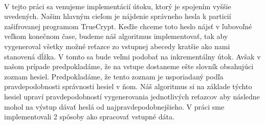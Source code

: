 \paragraph{}
V tejto práci sa venujeme implementácií útoku, ktorý je spojením vyššie uvedených. Našim hlavným cieľom je nájdenie správneho hesla k particií zašifrovanej programom TrueCrypt. Keďže chceme toto heslo nájsť v ľubovoľné veľkom konečnom čase, budeme náš algoritmus implementovať, tak aby vygeneroval všetky možné reťazce zo vstupnej abecedy kratšie ako nami stanovená dĺžka. V tomto sa bude veľmi podobať na inkrementálny útok. Avšak v našom prípade predpokladáme, že na vstupe dostaneme ešte slovník obsahujúci zoznam hesiel. Predpokladáme, že tento zoznam je usporiadaný podľa pravdepodobnosti správnosti hesiel v ňom. Náš algoritmus si na základe týchto hesiel upraví pravdepodobností vygenerovania jednotlivých reťazcov aby následne mohol na výstup dávať heslá od najpravdepodobnejšieho. V práci sme implementovali 2 spôsoby ako spracovať vstupné dáta.